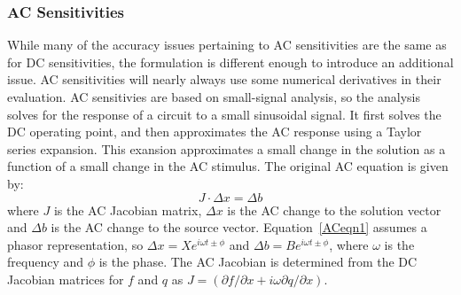\subsubsection{AC Sensitivities}
While many of the accuracy issues pertaining to AC sensitivities are the same as for DC sensitivities, 
the formulation is different enough to introduce an additional issue.  AC sensitivities will nearly always
use some numerical derivatives in their evaluation.  AC sensitivies are based on small-signal analysis, 
so the analysis solves for the response of a circuit to a small sinusoidal signal.  
It first solves the DC operating point, and then approximates the AC response 
using a Taylor series expansion.  This exansion approximates a small change in the solution as a 
function of a small change in the AC stimulus.  The original AC equation is given by:
\begin{equation}
J \cdot \Delta x = \Delta b
  \label{ACeqn1}
\end{equation}
where $J$ is the AC Jacobian matrix, $\Delta x$ is the AC change to the solution 
vector and $\Delta b$ is the AC change to the source vector.  Equation~\ref{ACeqn1} 
assumes a phasor representation, so $\Delta x = X e^{i\omega t \pm \phi}$ 
and $\Delta b = B e^{i\omega t \pm \phi}$, where $\omega$ is the frequency 
and $\phi$ is the phase.  The AC Jacobian is determined from the DC Jacobian matrices for $f$ and $q$ as $J = (\partial f/\partial x + i\omega \partial q/\partial x)$.

